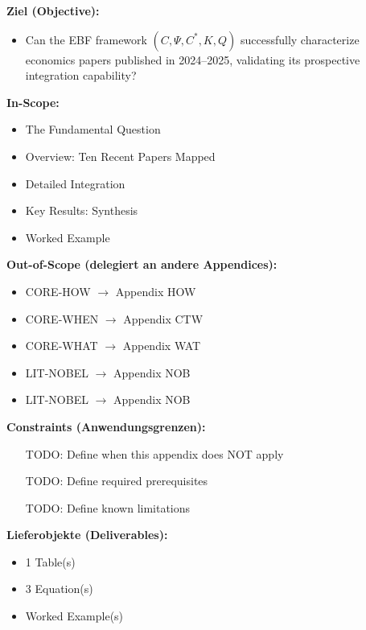 \begin{tcolorbox}[
    colback=orange!5!white,
    colframe=orange!75!black,
    title={\textbf{Appendix Scope: Ziel / In-Scope / Out-of-Scope / Constraints}},
    fonttitle=\bfseries
]

\textbf{Ziel (Objective):}
\begin{itemize}[nosep]
    \item Can the EBF framework $(C, \Psi, C^*, K, Q)$ successfully characterize
economics papers published in 2024--2025, validating its prospective
integration capability?
\end{itemize}

\textbf{In-Scope:}
\begin{itemize}[nosep]
    \item The Fundamental Question
    \item Overview: Ten Recent Papers Mapped
    \item Detailed Integration
    \item Key Results: Synthesis
    \item Worked Example
\end{itemize}

\textbf{Out-of-Scope (delegiert an andere Appendices):}
\begin{itemize}[nosep]
    \item CORE-HOW $\rightarrow$ Appendix HOW
    \item CORE-WHEN $\rightarrow$ Appendix CTW
    \item CORE-WHAT $\rightarrow$ Appendix WAT
    \item LIT-NOBEL $\rightarrow$ Appendix NOB
    \item LIT-NOBEL $\rightarrow$ Appendix NOB
\end{itemize}

\textbf{Constraints (Anwendungsgrenzen):}
\begin{itemize}[nosep]
    \item [TODO: Define when this appendix does NOT apply]
    \item [TODO: Define required prerequisites]
    \item [TODO: Define known limitations]
\end{itemize}

\textbf{Lieferobjekte (Deliverables):}
\begin{itemize}[nosep]
    \item 1 Table(s)
    \item 3 Equation(s)
    \item Worked Example(s)
\end{itemize}

\end{tcolorbox}


